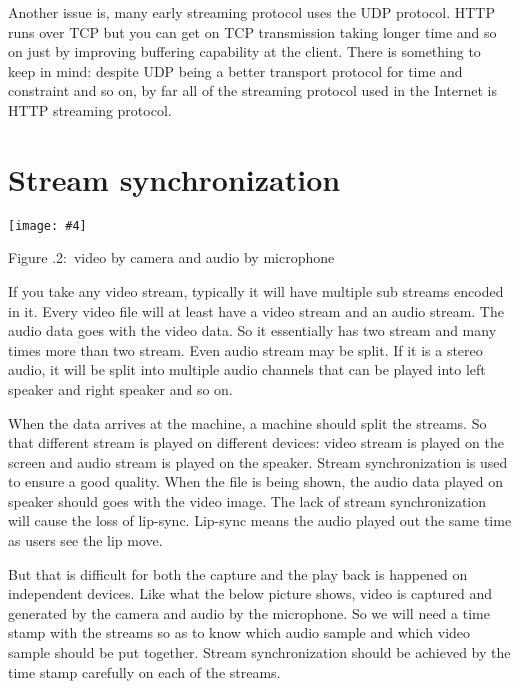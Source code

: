 \documentclass[twoside]{article}
\newcounter{lecnum}
\newcommand{\fig}[4]{
            \centerline{\texttt{[image: \#4]}}
            \begin{center}
            Figure \thelecnum.#1:~#3
            \end{center}
    }
\begin{document}
Another issue is, many early streaming protocol uses the UDP protocol. HTTP runs over TCP but you can get on TCP transmission taking longer time and so on just by improving buffering capability at the client. There is something to keep in mind: despite UDP being a better transport protocol for time and constraint and so on, by far all of the streaming protocol used in the Internet is HTTP streaming protocol.


\section{Stream synchronization}
 \fig{2}{1}{video by camera and audio by microphone}{microphoneandcamera.png}
 
If you take any video stream, typically it will have multiple sub streams encoded in it. Every video file will at least have a video stream and an audio stream. The audio data goes with the video data. So it essentially has two stream and many times more than two stream. Even audio stream may be split. If it is a stereo audio, it will be split into multiple audio channels that can be played into left speaker and right speaker and so on.

When the data arrives at the machine, a machine should split the streams. So that different stream is played on different devices: video stream is played on the screen and audio stream is played on the speaker. Stream synchronization is used to ensure a good quality. When the file is being shown, the audio data played on speaker should goes with the video image. The lack of stream synchronization will cause the loss of lip-sync. Lip-sync means the audio played out the same time as users see the lip move. 

But that is difficult for both the capture and the play back is happened on independent devices. Like what the below picture shows, video is captured and generated by the camera and audio by the microphone. So we will need a time stamp with the streams so as to know which audio sample and which video sample should be put together. Stream synchronization should be achieved by the time stamp carefully on each of the streams.
\end{document}
